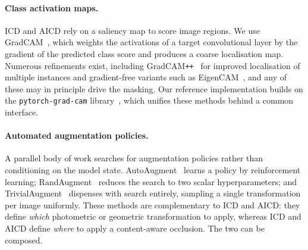\paragraph{Class activation maps.}
ICD and AICD rely on a saliency map to score image regions.  We use
GradCAM~\citep{selvaraju2017gradcam}, which weights the activations of a target
convolutional layer by the gradient of the predicted class score and produces a
coarse localisation map.  Numerous refinements exist, including
GradCAM\texttt{++}~\citep{chattopadhay2018gradcampp} for improved localisation
of multiple instances and gradient-free variants such as
EigenCAM~\citep{muhammad2020eigencam}, and any of these may in principle drive
the masking.  Our reference implementation builds on the
\texttt{pytorch-grad-cam} library~\citep{gildenblat2021gradcam}, which unifies
these methods behind a common interface.

\paragraph{Automated augmentation policies.}
A parallel body of work searches for augmentation policies rather than
conditioning on the model state.  AutoAugment~\citep{cubuk2019autoaugment}
learns a policy by reinforcement learning;
RandAugment~\citep{cubuk2020randaugment} reduces the search to two scalar
hyperparameters; and TrivialAugment~\citep{muller2021trivialaugment} dispenses
with search entirely, sampling a single transformation per image uniformly.
These methods are complementary to ICD and AICD: they define \emph{which}
photometric or geometric transformation to apply, whereas ICD and AICD define
\emph{where} to apply a content-aware occlusion.  The two can be composed.
